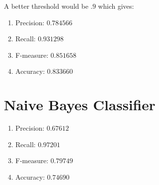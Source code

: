 \documentclass[12pt]{article}
\begin{document}
A better threshold would be $.9$ which gives:
\begin{enumerate}
    \item Precision: $0.784566$
    \item Recall:    $0.931298$
    \item F-measure: $0.851658$
    \item Accuracy:  $0.833660$
\end{enumerate}

\newpage


\section{Naive Bayes Classifier}\label{naive}
\begin{enumerate}
    \item Precision: $0.67612$
    \item Recall:    $0.97201$
    \item F-measure: $0.79749$
    \item Accuracy:  $0.74690$
\end{enumerate}
\end{document}
